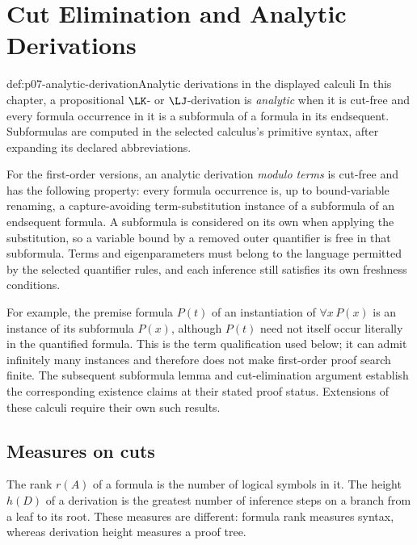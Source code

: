 \chapter{Cut Elimination and Analytic Derivations}
\label{ch:cut-elimination}

\begin{hbdefinition}{def:p07-analytic-derivation}{Analytic derivations in the displayed calculi}
In this chapter, a propositional \(\LK\)- or \(\LJ\)-derivation is
\emph{analytic} when it is cut-free and every formula occurrence in it is
a subformula of a formula in its endsequent.  Subformulas are computed in
the selected calculus's primitive syntax, after expanding its declared
abbreviations.

For the first-order versions, an analytic derivation \emph{modulo terms}
is cut-free and has the following property: every formula occurrence is,
up to bound-variable renaming, a capture-avoiding term-substitution instance
of a subformula of an endsequent formula.  A subformula is considered on
its own when applying the substitution, so a variable bound by a removed
outer quantifier is free in that subformula.  Terms and eigenparameters
must belong to the language permitted by the selected quantifier rules,
and each inference still satisfies its own freshness conditions.

For example, the premise formula \(P(t)\) of an instantiation of
\(\forall x\,P(x)\) is an instance of its subformula \(P(x)\),
although \(P(t)\) need not itself occur literally in the quantified
formula.  This is the term qualification used below; it can admit
infinitely many instances and therefore does not make first-order proof
search finite.  The subsequent subformula lemma and cut-elimination
argument establish the corresponding existence claims at their stated
proof status.  Extensions of these calculi require their own such results.
\end{hbdefinition}

\section{Measures on cuts}
\label{sec:cut-elimination-01}

\begin{definition}
The rank \(r(A)\) of a formula is the number of logical symbols in it.  The
height \(h(D)\) of a derivation is the greatest number of inference steps on a
branch from a leaf to its root.  These measures are different: formula rank
measures syntax, whereas derivation height measures a proof tree.
\end{definition}


